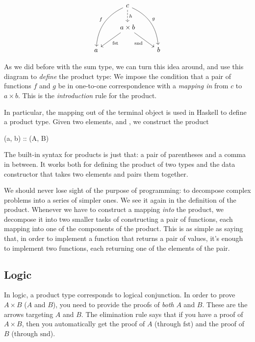 \documentclass[DaoFP]{subfiles}
\begin{document}
\[
 \begin{tikzcd}
 & c
\arrow[d, dashed, "h"]
 \arrow[ddl, bend right, "f"']
 \arrow[ddr, bend left, "g"]
\\
&a \times b
 \arrow[dl,  "\text{fst}"]
  \arrow[dr,   "\text{snd}"']
\\
a && b
 \end{tikzcd}
\]

As we did before with the sum type, we can turn this idea around, and use this diagram to \emph{define} the product type: We impose the condition that a pair of functions $f$ and $g$ be in one-to-one correspondence with a \emph{mapping in} from $c$ to $a \times b$. This is the \emph{introduction} rule for the product.

In particular, the mapping out of the terminal object is used in Haskell to define a product type. Given two elements,  and , we construct the product 

\begin{haskell}
(a, b) :: (A, B)
\end{haskell}
The built-in syntax for products is just that: a pair of parentheses and a comma in between. It works both for defining the product of two types  and the data constructor  that takes two elements and pairs them together. 

We should never lose sight of the purpose of programming: to decompose complex problems into a series of simpler ones. We see it again in the definition of the product. Whenever we have to construct a mapping \emph{into} the product, we decompose it into two smaller tasks of constructing a pair of functions, each mapping into one of the components of the product. This is as simple as saying that, in order to implement a function that returns a pair of values, it's enough to implement two functions, each returning one of the elements of the pair.

\subsection{Logic}

In logic, a product type corresponds to logical conjunction. In order to prove $A \times B$ ($A$ and $B$), you need to provide the proofs of \emph{both} $A$ and $B$. These are the arrows targeting $A$ and $B$. The elimination rule says that if you have a proof of $A \times B$, then you automatically get the proof of $A$ (through $\text{fst}$) and the proof of $B$ (through $\text{snd}$).
\end{document}
